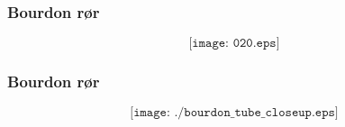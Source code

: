 \documentclass[aspectratio=169,xcolor=dvipsnames]{beamer}
\begin{document}
%
%
%
%
%
%
%
\begin{frame}
	\frametitle{Bourdon rør}

	$$\texttt{[image: 020.eps]}$$
\end{frame}

%
%
%
%
%
\begin{frame}
	\frametitle{Bourdon rør}

	$$\texttt{[image: ./bourdon\_tube\_closeup.eps]}$$
\end{frame}
\end{document}
